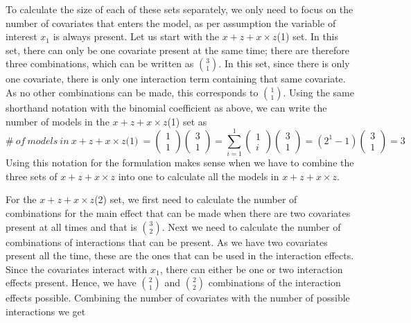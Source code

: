 To calculate the size of each of these sets separately, we only need to focus on the number of covariates that enters the model, as per assumption the variable of interest $x_1$ is always present. Let us start with the $x + z + x \times z$(1) set. In this set, there can only be one covariate present at the same time; there are therefore three combinations, which can be written as $\binom{3}{1}$. In this set, since there is only one covariate, there is only one interaction term containing that same covariate. As no other combinations can be made, this corresponds to $\binom{1}{1}$. Using the same shorthand notation with the binomial coefficient as above, we can write the number of models in the $x + z + x \times z$(1) set as
\[\#\ of\ models\ in\ x + z + x \times z\textit{(1)}\ =\left( \begin{array}{c}
1 \\ 
1 \end{array}
\right)\left( \begin{array}{c}
3 \\ 
1 \end{array}
\right)=\sum^1_{i=1}{\left( \begin{array}{c}
1 \\ 
i \end{array}
\right)}\left( \begin{array}{c}
3 \\ 
1 \end{array}
\right)=\left(2^1-1\right)\left( \begin{array}{c}
3 \\ 
1 \end{array}
\right)=3\] 
Using this notation for the formulation makes sense when we have to combine the three sets of $x + z + x \times z$ into one to calculate all the models in $x + z + x \times z$.

For the $x + z + x \times z$(2) set, we first need to calculate the number of combinations for the main effect that can be made when there are two covariates present at all times and that is $\binom{3}{2}$. Next we need to calculate the number of combinations of interactions that can be present. As we have two covariates present all the time, these are the ones that can be used in the interaction effects. Since the covariates interact with $x_1$, there can either be one or two interaction effects present. Hence, we have $\binom{2}{1}$ and $\binom{2}{2}$ combinations of the interaction effects possible. Combining the number of covariates with the number of possible interactions we get


